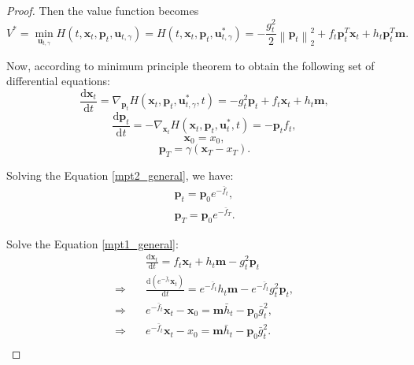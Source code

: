 \begin{proof}
Then the value function becomes
\begin{equation}
V^*=\min_{\mathbf{u}_{t,\gamma}}H(t,\mathbf{x}_t,\mathbf{p}_t,\mathbf{u}_{t, \gamma})=H(t,\mathbf{x}_t,\mathbf{p}_t,\mathbf{u}_{t, \gamma}^*)= -\frac{g^2_t}{2}\left\|\mathbf{p}_t\right\|^2_2 + f_t \mathbf{p}_t^{T} \mathbf{x}_t + h_t \mathbf{p}_t^{T} \mathbf{m}.
\end{equation}

Now, according to minimum principle theorem to obtain the following set of differential equations: 
\begin{equation}\label{mpt1_general}
\frac{\mathrm{d}\mathbf{x}_{t}}{\mathrm{d}t}=\nabla_{\mathbf{p}_t}H\left(\mathbf{x}_{t},\mathbf{p}_{t},\mathbf{u}_{t, \gamma}^{*},t\right)= - g^2_t \mathbf{p}_{t} + f_t\mathbf{x}_t + h_t\mathbf{m},
\end{equation}
\begin{equation}\label{mpt2_general}
\frac{\mathrm{d}\mathbf{p}_{t}}{\mathrm{d}t}= -\nabla_{\mathbf{x}_t}H\left(\mathbf{x}_{t},\mathbf{p}_{t},\mathbf{u}_{t}^{*},t\right) = -\mathbf{p}_{t} f_t,
\end{equation}
\begin{equation}\label{mpt3_general}
\mathbf{x}_{0} = x_{0},
\end{equation}
\begin{equation}\label{mpt4_general}
\mathbf{p}_{T}=\gamma \left(\mathbf{x}_T-x_{T}\right).
\end{equation}

Solving the Equation \eqref{mpt2_general}, we have:
\begin{equation}
\begin{gathered}
\mathbf{p}_{t} = \mathbf{p}_{0} e^{-\bar{f}_{t}}, \\
\mathbf{p}_{T} = \mathbf{p}_{0} e^{-\bar{f}_{T}}.
\end{gathered}
\end{equation}

Solve the Equation \eqref{mpt1_general}:
\begin{align*}
    &\frac{\mathrm{d} \mathbf{x}_t}{\mathrm{d} t} = f_t\mathbf{x}_t + h_t\mathbf{m} - g^2_t \mathbf{p}_{t} \\
    \Rightarrow \quad &\frac{\mathrm{d} (e^{-\bar{f}_{t}} \mathbf{x}_t)}{\mathrm{d} t} = e^{-\bar{f}_{t}} h_t \mathbf{m} - e^{-\bar{f}_{t}} g^2_t \mathbf{p}_{t}, \\
    \Rightarrow \quad &e^{-\bar{f}_{t}} \mathbf{x}_t - \mathbf{x}_0 = \mathbf{m} \bar{h}_{t} - \mathbf{p}_{0} \bar{g}^2_{t},  \\
    \Rightarrow \quad &e^{-\bar{f}_{t}} \mathbf{x}_t - x_0 = \mathbf{m} \bar{h}_{t} - \mathbf{p}_{0} \bar{g}^2_{t}. \\
\end{align*}


\end{proof}
